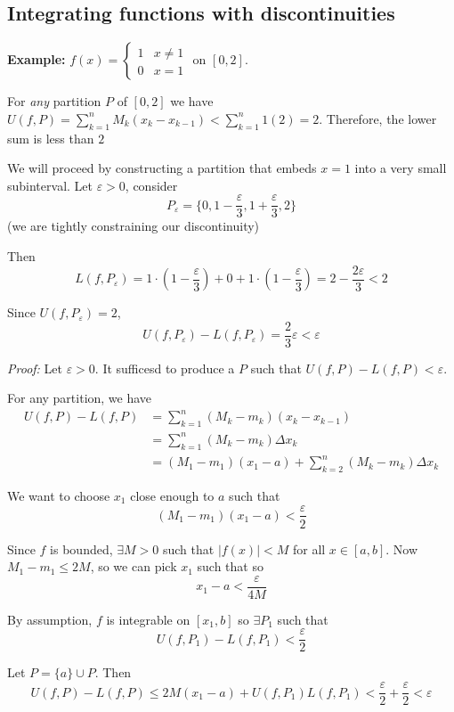 \documentclass[12pt]{report}
\newcommand{\R}{\mathbb{R}}
\newcommand{\abs}[1]{\left\vert #1 \right\vert}
\newcommand{\ep}{\varepsilon}
\newenvironment*{tbox}[2][gray]{
    \begin{tcolorbox}[
        parbox=false,
        colback=#1!5!white,
        colframe=#1!75!black,
        breakable,
        title={#2}
    ]}
    {\end{tcolorbox}}
\begin{document}
    \subsection*{Integrating functions with discontinuities}
        \textbf{Example:} $f(x) = \begin{cases}
            1 & x \neq 1\\ 
            0 & x = 1
        \end{cases}$ on $[0, 2]$. 

        For \emph{any} partition $P$ of $[0, 2]$ we have $U(f, P) = \sum_{k=1}^n M_k(x_k - x_{k - 1}) < \sum_{k=1}^n 1(2) = 2$. Therefore, the lower sum is less than $2$

        We will proceed by constructing a partition that embeds $x = 1$ into a very small subinterval. Let $\ep > 0$, consider 
        \[P_{\ep} = \{0, 1 - \frac{\ep}{3}, 1 + \frac{\ep}{3}, 2\}\]
        (we are tightly constraining our discontinuity) 

        Then 
        \[L(f, P_{\ep}) = 1 \cdot (1 - \frac{\ep}{3}) + 0 + 1\cdot (1 - \frac{\ep}{3}) = 2 - \frac{2\ep}{3} < 2\]

        Since $U(f, P_{\ep}) = 2$, 
        \[U(f, P_{\ep}) - L(f, P_{\ep}) = \frac{2}{3}\ep < \ep\]

        \begin{tbox}{\textbf{Theorem:} If $f: [a,b] \to \R$ is bounded and $f$ is integrable on $[c, b]$ for all $c \in (a, b)$, then $f$ is integrable on $[a, b]$}
            \emph{Proof:} Let $\ep > 0$. It sufficesd to produce a $P$ such that $U(f, P) - L(f, P) < \ep$. 

            For any partition, we have 
            \begin{align*}
                U(f, P) - L(f, P) &= \sum_{k=1}^n (M_k - m_k)(x_k - x_{k-1})\\
                    &= \sum_{k=1}^n (M_k - m_k) \Delta x_k\\
                    &= (M_1 - m_1)(x_1 - a) + \sum_{k=2}^n (M_k - m_k) \Delta x_k
            \end{align*}
            
            We want to choose $x_1$ close enough to $a$ such that 
            \[(M_1 - m_1)(x_1 - a) < \frac{\ep}{2}\]

            Since $f$ is bounded, $\exists M > 0$ such that $\abs{f(x)} < M$ for all $x \in [a, b]$. Now $M_1 - m_1 \leq 2M$, so we can pick $x_1$ such that so 
            \[x_1 - a < \frac{\ep}{4M}\]

            By assumption, $f$ is integrable on $[x_1, b]$ so $\exists P_1$ such that 
            \[U(f, P_1) - L(f, P_1) < \frac{\ep}{2}\]

            Let $P = \{a\} \cup P$. Then 
            \[U(f, P) - L(f, P) \leq 2M(x_1 - a) + U(f, P_1)  L(f, P_1) < \frac{\ep}{2} + \frac{\ep}{2} < \ep\]
        \end{tbox}
\end{document}

